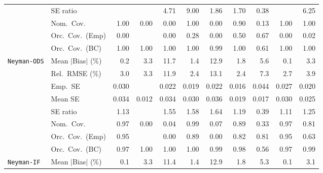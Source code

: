 \begin{landscape}
\begin{longtable}{llrrrrrrrrr}
 & SE ratio &  &  & 4.71 & 9.00 & \cellcolor{rankthree}1.86 & \cellcolor{ranktwo}1.70 & \cellcolor{rankone}0.38 &  & 6.25 \\
 & Nom.\ Cov. & \cellcolor{rankone}1.00 & \cellcolor{rankthree}0.00 & \cellcolor{rankthree}0.00 & \cellcolor{rankone}1.00 & \cellcolor{rankthree}0.00 & \cellcolor{rankone}0.90 & \cellcolor{ranktwo}0.13 & \cellcolor{rankone}1.00 & \cellcolor{rankone}1.00 \\
 & Orc.\ Cov.\ (Emp) & 0.00 &  & 0.00 & \cellcolor{rankthree}0.28 & 0.00 & \cellcolor{ranktwo}0.50 & \cellcolor{rankone}0.67 & 0.00 & 0.02 \\
 & Orc.\ Cov.\ (BC) & \cellcolor{ranktwo}1.00 & \cellcolor{ranktwo}1.00 & \cellcolor{ranktwo}1.00 & \cellcolor{ranktwo}1.00 & \cellcolor{rankone}0.99 & \cellcolor{ranktwo}1.00 & \cellcolor{rankthree}0.61 & \cellcolor{ranktwo}1.00 & \cellcolor{ranktwo}1.00 \\
\addlinespace[2pt]
\quad \texttt{Neyman-ODS} & Mean $|$Bias$|$ (\%) & \cellcolor{ranktwo}0.2 & 3.3 & 11.7 & \cellcolor{rankthree}1.4 & 12.9 & 1.8 & 5.6 & \cellcolor{rankone}0.1 & 3.3 \\
 & Rel.\ RMSE (\%) & \cellcolor{rankthree}3.0 & 3.3 & 11.9 & \cellcolor{rankone}2.4 & 13.1 & \cellcolor{rankone}2.4 & 7.3 & \cellcolor{ranktwo}2.7 & 3.9 \\
 & Emp.\ SE & 0.030 &  & 0.022 & 0.019 & 0.022 & 0.016 & 0.044 & 0.027 & 0.020 \\
 & Mean SE & 0.034 & 0.012 & 0.034 & 0.030 & 0.036 & 0.019 & 0.017 & 0.030 & 0.025 \\
 & SE ratio & \cellcolor{ranktwo}1.13 &  & 1.55 & 1.58 & 1.64 & \cellcolor{rankthree}1.19 & 0.39 & \cellcolor{rankone}1.11 & 1.25 \\
 & Nom.\ Cov. & \cellcolor{rankone}0.97 & 0.00 & 0.04 & \cellcolor{ranktwo}0.99 & 0.07 & \cellcolor{rankthree}0.89 & 0.33 & \cellcolor{rankone}0.97 & 0.81 \\
 & Orc.\ Cov.\ (Emp) & \cellcolor{rankone}0.95 &  & 0.00 & \cellcolor{ranktwo}0.89 & 0.00 & \cellcolor{rankthree}0.82 & 0.81 & \cellcolor{rankone}0.95 & 0.63 \\
 & Orc.\ Cov.\ (BC) & \cellcolor{rankone}0.97 & 1.00 & 1.00 & 1.00 & \cellcolor{rankthree}0.99 & \cellcolor{ranktwo}0.98 & 0.56 & \cellcolor{rankone}0.97 & \cellcolor{rankthree}0.99 \\
\addlinespace[2pt]
\quad \texttt{Neyman-IF} & Mean $|$Bias$|$ (\%) & \cellcolor{rankone}0.1 & 3.3 & 11.4 & \cellcolor{ranktwo}1.4 & 12.9 & \cellcolor{rankthree}1.8 & 5.3 & \cellcolor{rankone}0.1 & 3.1 \\

\end{longtable}
\end{landscape}
